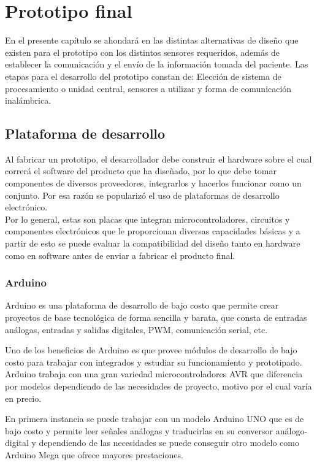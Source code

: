 \chapter{Prototipo final}\label{protof}
En el presente capítulo se ahondará en las distintas alternativas de diseño que existen para el prototipo con los distintos sensores requeridos, además de establecer la comunicación y el envío de la información tomada del paciente. Las etapas para el desarrollo del prototipo constan de: Elección de sistema de procesamiento o unidad central, sensores a utilizar y forma de comunicación inalámbrica.
\section{Plataforma de desarrollo}\label{proce}
Al fabricar un prototipo, el desarrollador debe construir el hardware sobre el cual correrá el software del producto que ha diseñado, por lo que debe tomar componentes de diversos proveedores, integrarlos y hacerlos funcionar como un conjunto. Por esa razón se popularizó el uso de plataformas de desarrollo electrónico.  \\
Por lo general, estas son placas que integran microcontroladores, circuitos y componentes electrónicos que le proporcionan diversas capacidades básicas y a partir de esto se puede evaluar la compatibilidad del diseño tanto en hardware como en software antes de enviar a fabricar el producto final. 

\newpage
\subsection{Arduino}
Arduino es una plataforma de desarrollo de bajo costo que permite crear proyectos de base tecnológica de forma sencilla y barata, que consta de entradas análogas, entradas y salidas digitales, PWM, comunicación serial, etc. 

Uno de los beneficios de Arduino es que provee módulos de desarrollo de bajo costo para trabajar con integrados y estudiar su funcionamiento y prototipado.
Arduino trabaja con una gran variedad microcontroladores AVR que diferencia por modelos dependiendo de las necesidades de proyecto, motivo por el cual varía en precio. 

En primera instancia se puede trabajar con un modelo Arduino UNO que es de bajo costo y permite leer señales análogas y traducirlas en su conversor análogo-digital y dependiendo de las necesidades se puede conseguir otro modelo como Arduino Mega que ofrece mayores prestaciones. 
